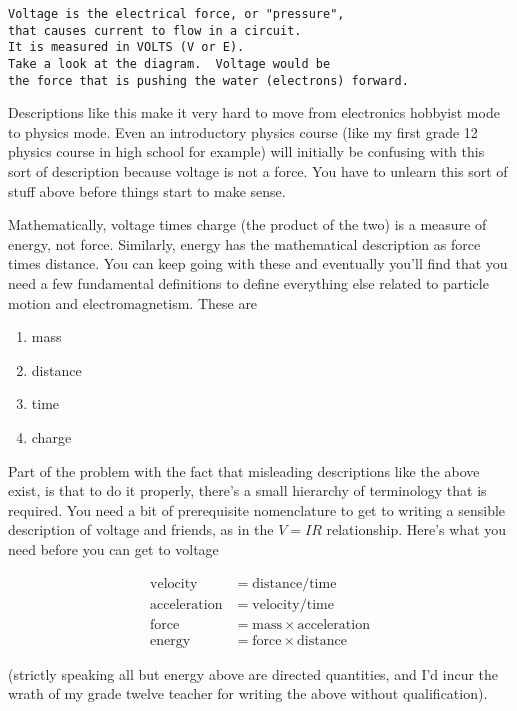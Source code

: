 \begin{lstlisting}
Voltage is the electrical force, or "pressure",
that causes current to flow in a circuit.
It is measured in VOLTS (V or E). 
Take a look at the diagram.  Voltage would be
the force that is pushing the water (electrons) forward.
\end{lstlisting}

Descriptions like this make it very hard to move from electronics hobbyist mode to physics mode.  Even an introductory
physics course (like my first grade 12 physics course in high school for example) will initially be confusing with this sort of description because voltage is not a force.  You have to unlearn this sort of stuff above before things start to make sense.

Mathematically, voltage times charge (the product of the two) is a measure of energy, not force.
Similarly, energy has the mathematical description as force times distance.  You can keep going with these and
eventually you'll find that you need a few fundamental definitions to define everything else related to particle motion 
and electromagnetism.  These are

\begin{enumerate}
\item mass
\item distance
\item time
\item charge
\end{enumerate}

Part of the problem with the fact that misleading descriptions like the above exist, is that to do it
properly, there's a small hierarchy of terminology that is required.  You need a bit
of prerequisite nomenclature to get to writing a sensible description of voltage and friends, as in
the $V = I R$ relationship.  Here's what you need 
before you can get to voltage

\begin{align*}
\text{velocity} &= \text{distance}/ \text{time} \\
\text{acceleration} &= \text{velocity} / \text{time} \\
\text{force} &= \text{mass} \times \text{acceleration} \\
\text{energy} &= \text{force} \times \text{distance}
\end{align*}

(strictly speaking all but energy above are directed quantities, and I'd incur the wrath of my grade twelve teacher for
 writing the above without qualification).


